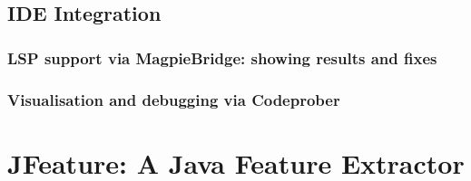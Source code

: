 \subsection{IDE Integration}
\subsubsection{LSP support via MagpieBridge: showing results and fixes}

\subsubsection{Visualisation and debugging via Codeprober}



\section{JFeature: A Java Feature Extractor}






\label{sec:contribution}





